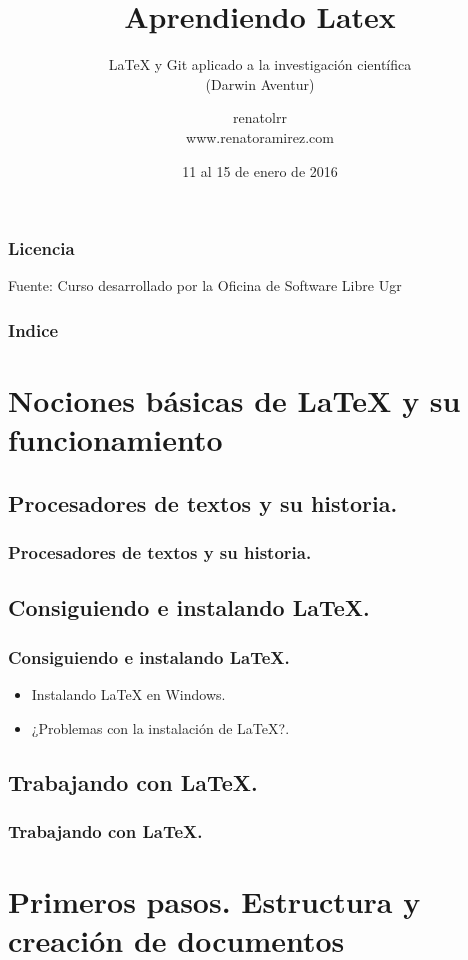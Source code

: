 \documentclass{beamer}
\title[Latex]{Aprendiendo Latex}
\subtitle{LaTeX y Git aplicado a la investigación científica\\ (Darwin Aventur)}
\author[Renato L. Ramírez Rivero]
{renatolrr\\
www.renatoramirez.com}
\date{11 al 15 de enero de 2016}
\begin{document}
\frame{\titlepage}

\begin{frame}
\frametitle{Licencia}
\doclicenseThis
Fuente: Curso desarrollado por la Oficina de Software Libre Ugr
\end{frame}

\begin{frame}
\frametitle{Indice}
{\tiny
\tableofcontents
}
\end{frame}

\section{Nociones básicas de LaTeX y su funcionamiento}
\subsection{Procesadores de textos y su historia.}

\begin{frame}
  \frametitle{Procesadores de textos y su historia.}
\end{frame}

\subsection{Consiguiendo e instalando LaTeX.}
\begin{frame}
  \frametitle{Consiguiendo e instalando LaTeX.}
  \begin{itemize}
  \item<1->{Instalando LaTeX en Windows.}
  \item<2->{¿Problemas con la instalación de LaTeX?.}
   \end{itemize}
\end{frame}


\subsection{Trabajando con LaTeX.}
\begin{frame}
  \frametitle{Trabajando con LaTeX.}
\end{frame}

\section{Primeros pasos. Estructura y creación de documentos}
\end{document}
